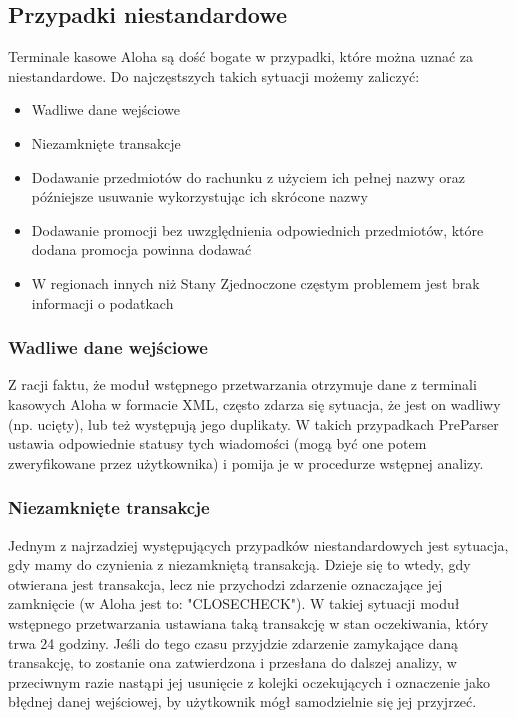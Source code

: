 \documentclass[a4paper]{book}
\begin{document}
\subsection{Przypadki niestandardowe}
Terminale kasowe Aloha są dość bogate w przypadki, które można uznać za niestandardowe. Do najczęstszych takich sytuacji możemy zaliczyć:
 \begin{itemize}
 	\item Wadliwe dane wejściowe
 	\item Niezamknięte transakcje
 	\item Dodawanie przedmiotów do rachunku z użyciem ich pełnej nazwy oraz późniejsze usuwanie wykorzystując ich skrócone nazwy
 	\item Dodawanie promocji bez uwzględnienia odpowiednich przedmiotów, które dodana promocja powinna dodawać
 	\item W regionach innych niż Stany Zjednoczone częstym problemem jest brak informacji o podatkach
 \end{itemize}
\subsubsection{Wadliwe dane wejściowe}
Z racji faktu, że moduł wstępnego przetwarzania otrzymuje dane z terminali kasowych Aloha w formacie XML, często zdarza się sytuacja, że jest on wadliwy (np. ucięty), lub też występują jego duplikaty. W takich przypadkach PreParser ustawia odpowiednie statusy tych wiadomości (mogą być one potem zweryfikowane przez użytkownika) i pomija je w procedurze wstępnej analizy.
\subsubsection{Niezamknięte transakcje}
Jednym z najrzadziej występujących przypadków niestandardowych jest sytuacja, gdy mamy do czynienia z niezamkniętą transakcją. Dzieje się to wtedy, gdy otwierana jest transakcja, lecz nie przychodzi zdarzenie oznaczające jej zamknięcie (w Aloha jest to: "CLOSECHECK"). W takiej sytuacji moduł wstępnego przetwarzania ustawiana taką transakcję w stan oczekiwania, który trwa 24 godziny. Jeśli do tego czasu przyjdzie zdarzenie zamykające daną transakcję, to zostanie ona zatwierdzona i przesłana do dalszej analizy, w przeciwnym razie nastąpi jej usunięcie z kolejki oczekujących i oznaczenie jako błędnej danej wejściowej, by użytkownik mógł samodzielnie się jej przyjrzeć.
\end{document}
